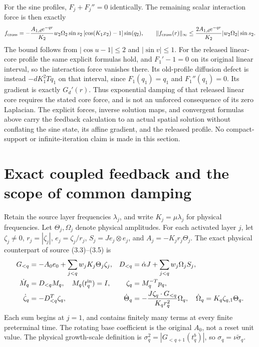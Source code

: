 For the sine profiles, $F_j+F_j''=0$ identically. The remaining
scalar interaction force is then exactly
\[
 f_{\rm cross}=-\frac{A_{1,d}e^{-qr}}{K_2}
   w_2\Omega_2\sin s_2\,[\cos(K_1x_2)-1]\sin(q_2),
 \qquad
 \|f_{\rm cross}(r)\|_\infty
 \leq\frac{2A_{1,d}e^{-qr}}{K_2}|w_2\Omega_2|\sin s_2.
\]
The bound follows from $|\cos u-1|\leq2$ and $|\sin v|\leq1$.
For the released linear-core profile the same explicit formulas hold,
and $F_1'-1=0$ on its original linear interval, so the interaction
force vanishes there. Its old-profile diffusion defect is instead
$-dK_1^2Tq_1$ on that interval, since $F_1(q_1)=q_1$ and
$F_1''(q_1)=0$. Its gradient is exactly $G_d'(r)$.
Thus exponential damping of that released linear core requires the
stated core force, and is not an unforced consequence of its zero
Laplacian. The explicit forces, inverse solution maps, and convergent
formulas above carry the feedback calculation to an actual spatial
solution without conflating the sine state, its affine gradient, and
the released profile. No compact-support or infinite-iteration claim
is made in this section.


\section{Exact coupled feedback and the scope of common damping}
\label{cvlane:sec:feedback}
Retain the source layer frequencies $\lambda_j$, and write
$K_j=\mu\lambda_j$ for physical frequencies. Let $\Theta_j,
\Omega_j$ denote physical amplitudes. For each activated layer
$j$, let $\zeta_j\ne0$, $r_j=|\zeta_j|$, $e_j=\zeta_j/r_j$,
$S_j=Je_j\otimes e_j$, and $A_j=-K_jr_j\Theta_j$.
The exact physical counterpart of source (3.3)--(3.5) is
\begin{align}
 G_{<q}&=-A_0e_0+\sum_{j<q}w_jK_j\Theta_j\zeta_j,
 &D_{<q}&=\dot\alpha J+\sum_{j<q}w_j\Omega_jS_j,\notag\\
 \dot M_q&=D_{<q}M_q,\quad M_q(t_q^{\rm in})=I,
 &\zeta_q&=M_q^{-T}p_q,\notag\\
 \dot\zeta_q&=-D_{<q}^T\zeta_q,
 &\dot\Theta_q&=-\frac{J\zeta_q\cdot G_{<q}}{K_qr_q^2}\Omega_q,
 \quad\dot\Omega_q=K_q\zeta_{q,1}\Theta_q.
 \label{cvlane:eq:physicalcoupled}
\end{align}
Each sum begins at $j=1$, and contains finitely many terms at
every finite preterminal time. The rotating base coefficient
is the original $A_0$, not a reset unit value. The physical
growth-scale definition is $\sigma_q^2=|G_{<q+1}(t_q^b)|$,
so $\sigma_q=\nu\widetilde\sigma_q$.

